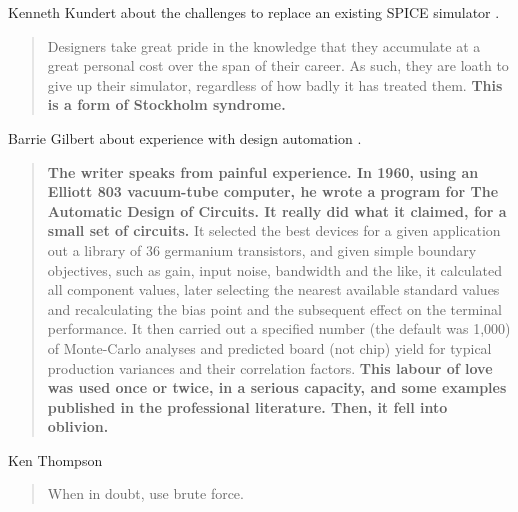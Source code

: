 \documentclass[10pt, aspectratio=169]{beamer}
\begin{document}
\begin{frame}[fragile]

Kenneth Kundert about the challenges to replace an existing SPICE 
simulator \cite[p. 24]{kundert-lifeafterspice-11}.

\vspace{0.5cm}

\begin{quote}
Designers take great pride in the knowledge that they accumulate at a
great personal cost over the span of their career. 
As such, they are loath to give up their simulator, regardless of how badly it 
has treated them.
\textbf{This is a form of Stockholm syndrome.}
\end{quote}
\end{frame}

\begin{frame}[fragile]
Barrie Gilbert about experience with design automation \cite[p. 39]{gilbert-dfm-02}.

\vspace{0.5cm}

\begin{quote}
\textbf{The writer speaks from painful experience.
In 1960, using an Elliott 803 vacuum-tube computer, he wrote a program for 
The Automatic Design of Circuits.
It really did what it claimed, for a small set of circuits.}
It selected the best devices for a given application out a library of 36 
germanium transistors, and given simple boundary objectives, such as
gain, input noise, bandwidth and the like, it calculated all component values, 
later selecting the nearest available standard values and recalculating the 
bias point and the subsequent effect on the terminal performance.
It then carried out a specified number (the default was 1,000) of 
Monte-Carlo analyses and predicted board (not chip) yield for typical production
variances and their correlation factors.
\textbf{This labour of love was used once or twice, in a
serious capacity, and some examples published in the professional literature.
Then, it fell into oblivion.}
\end{quote}

\end{frame}

\begin{frame}[fragile]
Ken Thompson 

\vspace{0.5cm}

\begin{quote}
When in doubt, use brute force.
\end{quote}
\end{frame}
\end{document}
